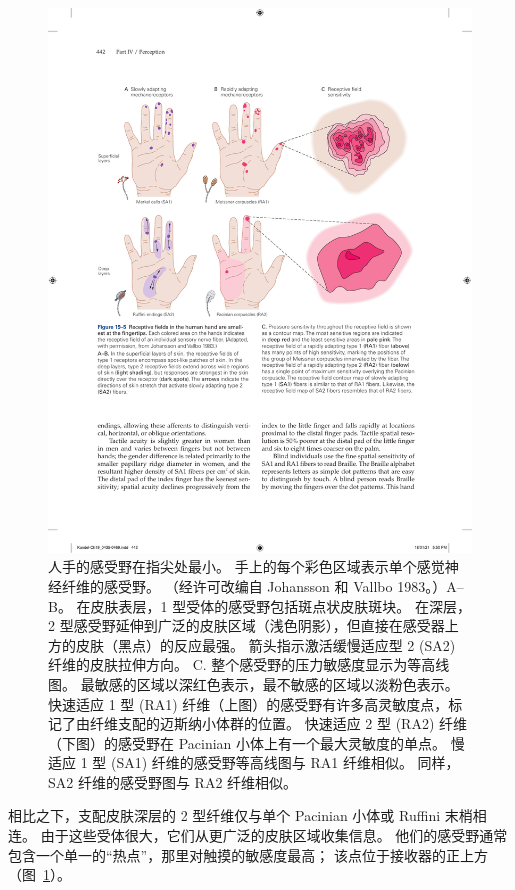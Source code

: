 \begin{figure}[htbp]
	\centering
	\includegraphics[width=1.0\linewidth]{chap19/fig_19_5}
	\caption{人手的感受野在指尖处最小。
		手上的每个彩色区域表示单个感觉神经纤维的感受野。 （经许可改编自 Johansson 和 Vallbo 1983。）A–B。
		在皮肤表层，1 型受体的感受野包括斑点状皮肤斑块。
		在深层，2 型感受野延伸到广泛的皮肤区域（浅色阴影），但直接在感受器上方的皮肤（黑点）的反应最强。 
		箭头指示激活缓慢适应型 2 (SA2) 纤维的皮肤拉伸方向。
		C. 整个感受野的压力敏感度显示为等高线图。
		最敏感的区域以深红色表示，最不敏感的区域以淡粉色表示。
		快速适应 1 型 (RA1) 纤维（上图）的感受野有许多高灵敏度点，标记了由纤维支配的迈斯纳小体群的位置。
		快速适应 2 型 (RA2) 纤维（下图）的感受野在 Pacinian 小体上有一个最大灵敏度的单点。
		慢适应 1 型 (SA1) 纤维的感受野等高线图与 RA1 纤维相似。
		同样，SA2 纤维的感受野图与 RA2 纤维相似。}
	\label{fig:19_5}
\end{figure}


相比之下，支配皮肤深层的 2 型纤维仅与单个 Pacinian 小体或 Ruffini 末梢相连。
由于这些受体很大，它们从更广泛的皮肤区域收集信息。 
他们的感受野通常包含一个单一的“热点”，那里对触摸的敏感度最高；
该点位于接收器的正上方（图~\ref{fig:19_5}）。


